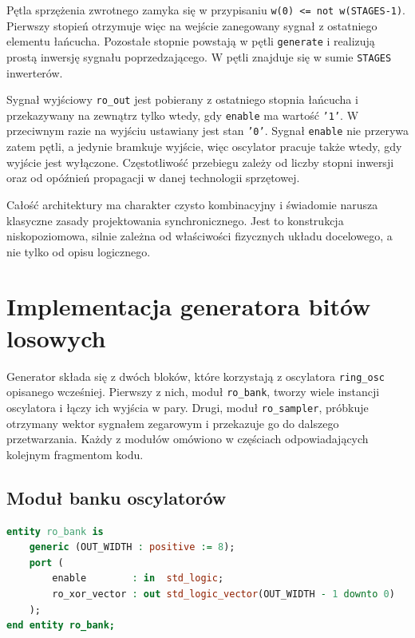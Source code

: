 Pętla sprzężenia zwrotnego zamyka się w przypisaniu
\texttt{w(0) <= not w(STAGES-1)}. Pierwszy stopień otrzymuje więc na wejście
zanegowany sygnał z ostatniego elementu łańcucha. Pozostałe stopnie powstają
w pętli \texttt{generate} i realizują prostą inwersję sygnału poprzedzającego.
W pętli znajduje się w sumie \texttt{STAGES} inwerterów.

Sygnał wyjściowy \texttt{ro\_out} jest pobierany z ostatniego stopnia łańcucha
i przekazywany na zewnątrz tylko wtedy, gdy \texttt{enable} ma wartość
\texttt{'1'}. W przeciwnym razie na wyjściu ustawiany jest stan \texttt{'0'}.
Sygnał \texttt{enable} nie przerywa zatem pętli, a jedynie bramkuje wyjście,
więc oscylator pracuje także wtedy, gdy wyjście jest wyłączone. Częstotliwość
przebiegu zależy od liczby stopni inwersji oraz od opóźnień propagacji
w danej technologii sprzętowej.

Całość architektury ma charakter czysto kombinacyjny i świadomie narusza
klasyczne zasady projektowania synchronicznego. Jest to konstrukcja
niskopoziomowa, silnie zależna od właściwości fizycznych układu docelowego,
a nie tylko od opisu logicznego.

\section{Implementacja generatora bitów losowych}

Generator składa się z dwóch bloków, które korzystają z oscylatora
\texttt{ring\_osc} opisanego wcześniej. Pierwszy z nich, moduł
\texttt{ro\_bank}, tworzy wiele instancji oscylatora i łączy ich wyjścia
w pary. Drugi, moduł \texttt{ro\_sampler}, próbkuje otrzymany wektor sygnałem
zegarowym i przekazuje go do dalszego przetwarzania. Każdy z modułów
omówiono w częściach odpowiadających kolejnym fragmentom kodu.

\subsection{Moduł banku oscylatorów}

\begin{lstlisting}[language=VHDL,
caption={Jednostka \texttt{ro\_bank} (\texttt{ro\_bank.vhdl})},
label={lst:ro_bank_entity}]
entity ro_bank is
    generic (OUT_WIDTH : positive := 8);
    port (
        enable        : in  std_logic;
        ro_xor_vector : out std_logic_vector(OUT_WIDTH - 1 downto 0)
    );
end entity ro_bank;
\end{lstlisting}

